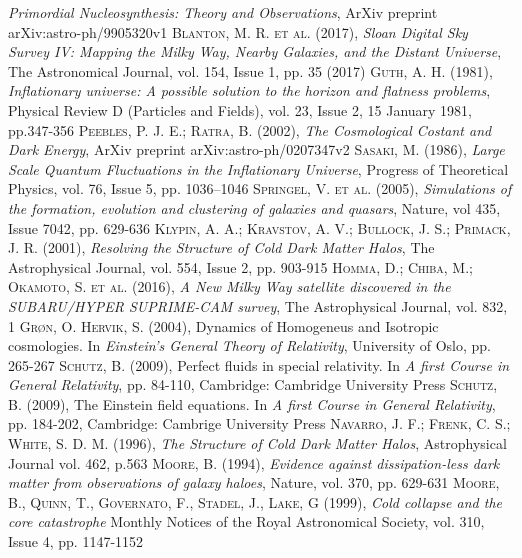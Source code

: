 \documentclass[a4paper,openright,12pt]{book}
\begin{document}
\begin{thebibliography}{a}
\textit{Primordial Nucleosynthesis: Theory and Observations},
ArXiv preprint arXiv:astro-ph/9905320v1 
 \textsc{Blanton, M. R. et al. (2017)},
\textit{Sloan Digital Sky Survey IV: Mapping the Milky Way, Nearby Galaxies, and the Distant Universe},
The Astronomical Journal, vol. 154, Issue 1, pp. 35 (2017)
 \textsc{Guth, A. H. (1981)},
\textit{Inflationary universe: A possible solution to the horizon and flatness problems},
Physical Review D (Particles and Fields), vol. 23, Issue 2, 15 January 1981, pp.347-356
 \textsc{Peebles, P. J. E.; Ratra, B. (2002)},
\textit{The Cosmological Costant and Dark Energy},
ArXiv preprint arXiv:astro-ph/0207347v2
 \textsc{Sasaki, M. (1986)},
\textit{Large Scale Quantum Fluctuations in the Inflationary Universe},
Progress of Theoretical Physics, vol. 76, Issue 5, pp. 1036–1046
 \textsc{Springel, V. et al. (2005)},
\textit{Simulations of the formation, evolution and clustering of galaxies and quasars},
Nature, vol 435, Issue 7042, pp. 629-636
 \textsc{Klypin, A. A.; Kravstov, A. V.; Bullock, J. S.; Primack, J. R. (2001)},
\textit{Resolving the Structure of Cold Dark Matter Halos},
The Astrophysical Journal, vol. 554, Issue 2, pp. 903-915
 \textsc{Homma, D.; Chiba, M.; Okamoto, S. et al. (2016)},
\textit{A New Milky Way satellite discovered in the SUBARU/HYPER SUPRIME-CAM survey},
The Astrophysical Journal, vol. 832, 1
 \textsc{ Grøn, O. Hervik, S. (2004)},
Dynamics of Homogeneus and Isotropic cosmologies. In
\textit{Einstein's General Theory of Relativity},
University of Oslo, pp. 265-267
 \textsc{Schutz, B. (2009)},
Perfect fluids in special relativity. In 
\textit{A first Course in General Relativity},
pp. 84-110, Cambridge: Cambridge University Press
 \textsc{Schutz, B. (2009)},
The Einstein field equations. In
\textit{A first Course in General Relativity},
pp. 184-202, Cambridge: Cambrige University Press
 \textsc{Navarro, J. F.; Frenk, C. S.; White, S. D. M. (1996)},
\textit{The Structure of Cold Dark Matter Halos},
Astrophysical Journal vol. 462, p.563
 \textsc{Moore, B. (1994)},
\textit{Evidence against dissipation-less dark matter from observations of galaxy haloes},
Nature, vol. 370, pp. 629-631 
 \textsc{Moore, B., Quinn, T., Governato, F., Stadel, J., Lake, G (1999)},
\textit{Cold collapse and the core catastrophe}
Monthly Notices of the Royal Astronomical Society, vol. 310, Issue 4, pp. 1147-1152

\end{thebibliography}
\end{document}
